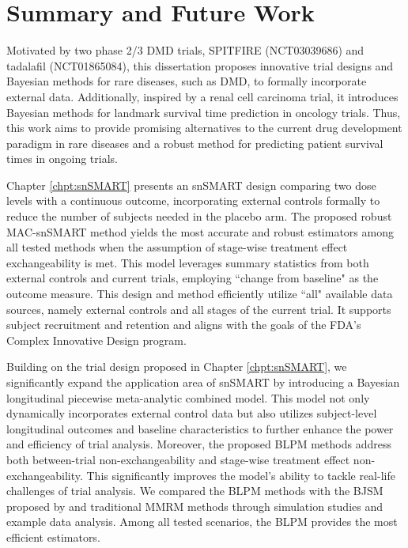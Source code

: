\chapter{Summary and Future Work}
\label{chpt:conclusion}
Motivated by two phase 2/3 \ac{DMD} trials, SPITFIRE (NCT03039686) and tadalafil (NCT01865084), this dissertation proposes innovative trial designs and Bayesian methods for rare diseases, such as \ac{DMD}, to formally incorporate external data. Additionally, inspired by a renal cell carcinoma trial, it introduces Bayesian methods for landmark survival time prediction in oncology trials. Thus, this work aims to provide promising alternatives to the current drug development paradigm in rare diseases and a robust method for predicting patient survival times in ongoing trials.

Chapter \ref{chpt:snSMART} presents an \ac{snSMART} design comparing two dose levels with a continuous outcome, incorporating external controls formally to reduce the number of subjects needed in the placebo arm. The proposed robust MAC-snSMART method yields the most accurate and robust estimators among all tested methods when the assumption of stage-wise treatment effect exchangeability is met. This model leverages summary statistics from both external controls and current trials, employing ``change from baseline" as the outcome measure. This design and method efficiently utilize ``all" available data sources, namely external controls and all stages of the current trial. It supports subject recruitment and retention and aligns with the goals of the \ac{FDA}'s Complex Innovative Design program.

Building on the trial design proposed in Chapter \ref{chpt:snSMART}, we significantly expand the application area of \ac{snSMART} by introducing a Bayesian longitudinal piecewise meta-analytic combined model. This model not only dynamically incorporates external control data but also utilizes subject-level longitudinal outcomes and baseline characteristics to further enhance the power and efficiency of trial analysis. Moreover, the proposed \ac{BLPM} methods address both between-trial non-exchangeability and stage-wise treatment effect non-exchangeability. This significantly improves the model's ability to tackle real-life challenges of trial analysis. We compared the \ac{BLPM} methods with the \ac{BJSM} proposed by \cite{fang2023comparing} and traditional MMRM methods through simulation studies and example data analysis. Among all tested scenarios, the \ac{BLPM} provides the most efficient estimators.

